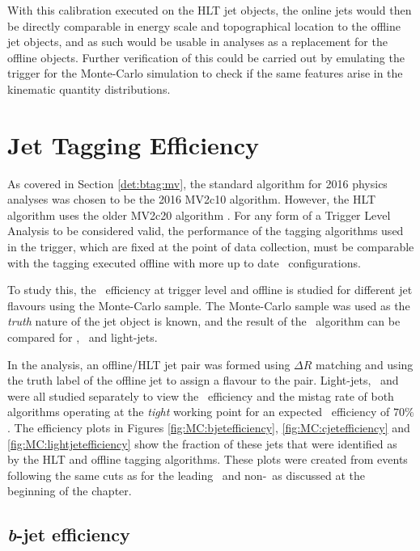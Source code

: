 		With this calibration executed on the HLT jet objects, the online jets would then be directly comparable in energy scale and topographical location to the offline jet objects, and as such would be usable in analyses as a replacement for the offline objects. Further verification of this could be carried out by emulating the trigger for the Monte-Carlo simulation to check if the same features arise in the kinematic quantity distributions.

\section{Jet Tagging Efficiency}

	As covered in Section  \ref{det:btag:mv}, the standard algorithm for 2016 physics analyses was chosen to be the 2016 MV2c10 algorithm. However, the HLT \btag\, algorithm uses the older MV2c20 algorithm \cite{trig2015}. For any form of a Trigger Level Analysis to be considered valid, the performance of the tagging algorithms used in the trigger, which are fixed at the point of data collection, must be comparable with the tagging executed offline with more up to date \btag\, configurations.

	To study this, the \btag\, efficiency at trigger level and offline is studied for different jet flavours using the Monte-Carlo sample. The Monte-Carlo sample was used as the \textit{truth} nature of the jet object is known, and the result of the \btag\, algorithm can be compared for \bjets, \cjets\, and light-jets.

	In the analysis, an offline/HLT jet pair was formed using $\Delta R$ matching and using the truth label of the offline jet to assign a flavour to the pair. Light-jets, \bjets\, and \cjets\, were all studied separately to view the \btag\, efficiency and the mistag rate of both algorithms operating at the \textit{tight} working point for an expected \btag\ efficiency of $70\%$. The efficiency plots in Figures \ref{fig:MC:bjetefficiency}, \ref{fig:MC:cjetefficiency} and \ref{fig:MC:lightjetefficiency} show the fraction of these jets that were identified as \bjets\, by the HLT and offline tagging algorithms. These plots were created from events following the same cuts as for the leading \bjet\ and non-\bjet\ as discussed at the beginning of the chapter.

	\subsection{\textit{b}-jet efficiency}
	\label{obp:beff}

